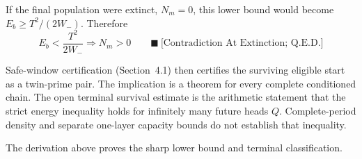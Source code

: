 If the final population were extinct, $N_m=0$, this lower bound would become
$E_b\ge T^2/(2W_-)$. Therefore
\begin{equation*}
E_b\lt\frac{T^2}{2W_-}
\Longrightarrow
N_m>0
\qquad\blacksquare\ \text{[Contradiction At Extinction; Q.E.D.]}
\end{equation*}

Safe-window certification (Section~4.1) then certifies the surviving eligible start as a twin-prime pair.
The implication is a theorem for every complete conditioned chain. The open
terminal survival estimate is the arithmetic statement that the strict energy inequality
holds for infinitely many future heads $Q$. Complete-period density and
separate one-layer capacity bounds do not establish that inequality.

{\raggedright
The derivation above proves the sharp lower bound and terminal classification.
\par}
